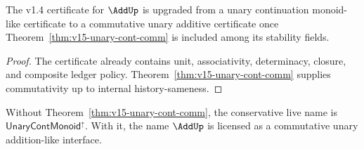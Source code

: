 \begin{corollary}
The v1.4 certificate for \(\AddUp\) is upgraded from a unary continuation monoid-like certificate to a commutative unary additive certificate once Theorem~\ref{thm:v15-unary-cont-comm} is included among its stability fields.
\end{corollary}

\begin{proof}
The certificate already contains unit, associativity, determinacy, closure, and composite ledger policy. Theorem~\ref{thm:v15-unary-cont-comm} supplies commutativity up to internal history-sameness.
\end{proof}

\begin{remark}
Without Theorem~\ref{thm:v15-unary-cont-comm}, the conservative live name is \(\mathsf{UnaryContMonoid}^{\uparrow}\). With it, the name \(\AddUp\) is licensed as a commutative unary addition-like interface.
\end{remark}

